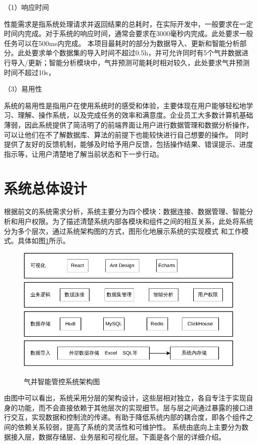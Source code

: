 （1）响应时间

性能需求是指系统处理请求并返回结果的总耗时，在实际开发中，一般要求在一定时间内完成。对于系统的响应时间，通常会要求在3000毫秒内完成。此处要求一般任务可以在500ms内完成。
本项目最耗时的部分为数据导入、更新和智能分析部分。此处要求单个数据集的导入时间不超过0.5h，并可允许同时有5个气井数据进行导入/更新；智能分析模块中，气井预测可能耗时相对较久，此处要求气井预测时间不超过10s，


（3）易用性

系统的易用性是指用户在使用系统时的感受和体验，主要体现在用户能够轻松地学习、理解、操作系统，以及完成任务的效率和满意度。企业员工大多数计算机基础薄弱，因此系统提供了简洁明了的前端界面让用户进行数据管理和数据分析操作，可以让他们在不了解数据库、算法的前提下也能较快进行自己想要的操作。
同时提供了友好的反馈机制，能够及时给予用户反馈，包括操作结果、错误提示、进度指示等，让用户清楚地了解当前状态和下一步行动。
\section{系统总体设计}
根据前文的系统需求分析，系统主要分为四个模块：数据连接、数据管理、智能分析和用户权限。为了描述清楚系统内部各模块和组件之间的相互关系，此处将系统分为多个层次，通过系统架构图的方式，图形化地展示系统的实现模式
和工作模式。具体如图\ref{fig:sysstruc}所示。
\begin{figure}[H]
    \centering
    \caption{气井智能管控系统架构图}
    \includegraphics{figure/系统架构图.pdf}
    \label{fig:sysstruc}
\end{figure}
由图中可以看出，系统采用分层的架构设计，这些层相对独立，各自专注于实现自身的功能，而不会直接依赖于其他层次的实现细节。层与层之间通过暴露的接口进行交互，实现数据和控制流的传递。有助于降低系统内部的耦合度，即各个组件之间的依赖关系较弱，提高了系统的灵活性和可维护性。
系统由底向上主要分为数据接入层，数据存储层、业务层和可视化层。下面是各个层的详细介绍。

